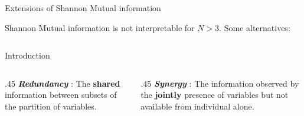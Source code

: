 \documentclass{beamer}
\renewcommand{\cite}[1]{\footnote<.->[frame]{\fullcite{#1}}}
\begin{document}
\begin{frame}{Extensions of Shannon Mutual information}

Shannon Mutual information is not interpretable for $N>3$. Some alternatives:
\newline
\begin{columns}
\end{columns}
\end{frame}



\begin{frame}{Introduction}
\begin{columns}
\begin{column}{.45\textwidth}
\textit{\textbf{Redundancy }}: The \textbf{shared} information between subsets of the partition of variables.
\newline
\end{column}
\begin{column}{.45\textwidth}
\textit{\textbf{Synergy }}: The information observed by the \textbf{jointly} presence of variables but not available from individual alone.
\newline
\end{column}
\end{columns}
\begin{figure}
    \centering
    
\end{figure}
\end{frame}
\end{document}

